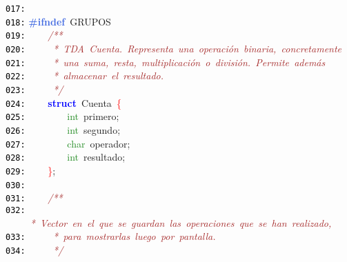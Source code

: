 \documentclass[a4paper,10pt]{scrartcl}
\begin{document}
{   \mbox{}\texttt{\textcolor{Black}{017:}} \ \  \\
   \mbox{}\texttt{\textcolor{Black}{018:}} \textbf{\textcolor{RoyalBlue}{\#ifndef}}\ GRUPOS \\
   \mbox{}\texttt{\textcolor{Black}{019:}} \ \ \ \ \textit{\textcolor{Brown}{/**}} \\
   \mbox{}\texttt{\textcolor{Black}{020:}} \textit{\textcolor{Brown}{\ \ \ \ \ *\ TDA\ Cuenta.\ Representa\ una\ operación\ binaria,\ concretamente}} \\
   \mbox{}\texttt{\textcolor{Black}{021:}} \textit{\textcolor{Brown}{\ \ \ \ \ *\ una\ suma,\ resta,\ multiplicación\ o\ división.\ Permite\ además}} \\
   \mbox{}\texttt{\textcolor{Black}{022:}} \textit{\textcolor{Brown}{\ \ \ \ \ *\ almacenar\ el\ resultado.}} \\
   \mbox{}\texttt{\textcolor{Black}{023:}} \textit{\textcolor{Brown}{\ \ \ \ \ */}} \\
   \mbox{}\texttt{\textcolor{Black}{024:}} \ \ \ \ \textbf{\textcolor{Blue}{struct}}\ \textcolor{TealBlue}{Cuenta}\ \textcolor{Red}{\{} \\
   \mbox{}\texttt{\textcolor{Black}{025:}} \ \ \ \ \ \ \ \ \textcolor{ForestGreen}{int}\ primero\textcolor{BrickRed}{;} \\
   \mbox{}\texttt{\textcolor{Black}{026:}} \ \ \ \ \ \ \ \ \textcolor{ForestGreen}{int}\ segundo\textcolor{BrickRed}{;} \\
   \mbox{}\texttt{\textcolor{Black}{027:}} \ \ \ \ \ \ \ \ \textcolor{ForestGreen}{char}\ operador\textcolor{BrickRed}{;} \\
   \mbox{}\texttt{\textcolor{Black}{028:}} \ \ \ \ \ \ \ \ \textcolor{ForestGreen}{int}\ resultado\textcolor{BrickRed}{;} \\
   \mbox{}\texttt{\textcolor{Black}{029:}} \ \ \ \ \textcolor{Red}{\}}\textcolor{BrickRed}{;} \\
   \mbox{}\texttt{\textcolor{Black}{030:}} \ \ \ \  \\
   \mbox{}\texttt{\textcolor{Black}{031:}} \ \ \ \ \textit{\textcolor{Brown}{/**}} \\
   \mbox{}\texttt{\textcolor{Black}{032:}} \textit{\textcolor{Brown}{\ \ \ \ \ *\ Vector\ en\ el\ que\ se\ guardan\ las\ operaciones\ que\ se\ han\ realizado,}} \\
   \mbox{}\texttt{\textcolor{Black}{033:}} \textit{\textcolor{Brown}{\ \ \ \ \ *\ para\ mostrarlas\ luego\ por\ pantalla.}} \\
   \mbox{}\texttt{\textcolor{Black}{034:}} \textit{\textcolor{Brown}{\ \ \ \ \ */}} \\
}
\end{document}
